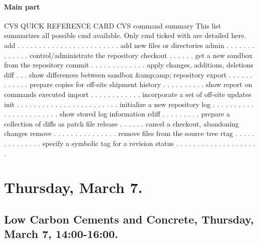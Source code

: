 % 



\subsubsection*{Main part}

CVS QUICK REFERENCE CARD
CVS command summary 
This list summarizes all possible cmd available. Only 
cmd ticked with are detailed here. 
add . . . . . . . . . . . . . . . . . . . . . . . . add new files or directories 
  admin . . . . . . . . . . . . . control/administrate the repository 
  checkout . . . . . . get a new sandbox from the repository 
  commit . . . . . . . . . . . . . apply changes, additions, deletions 
  diff . . . show differences between sandbox &amp;amp; repository 
    export . . . . . . . . . . . . prepare copies for off-site shipment 
      history . . . . . . . . . . show report on commands executed 
      import . . . . . . . . . . . . incorporate a set of off-site updates 
        init . . . . . . . . . . . . . . . . . . . . . . . . initialize a new repository 
        log . . . . . . . . . . . . . . . . . . . . . . . show stored log information 
        rdiff . . . . . . . . . prepare a collection of diffs as patch file 
            release . . . . . . cancel a checkout, abandoning changes 
            remove . . . . . . . . . . . . . . . remove files from the source tree 
              rtag . . . . . . . . . . . . . . specify a symbolic tag for a revision 
              status . . . . . . . . . . . . . . . . . . . .







\chapter*{Thursday, March 7.}



\section*{Low Carbon Cements and Concrete, Thursday, March 7, 14:00-16:00.}


